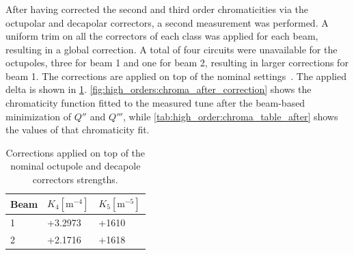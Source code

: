 \subsubsection{}

After having corrected the second and third order chromaticities via the octupolar and decapolar
correctors, a second measurement was performed.
A uniform trim on all the correctors of each class was applied for each beam, resulting in a global
correction. A total of four circuits were unavailable for the octupoles, three for beam 1 and one
for beam 2, resulting in larger corrections for beam 1. The corrections are applied on top of the
nominal settings~\cite{maclean_commissioning_2016}.
The applied delta is shown in \cref{tab:high_orders:mcdo_values_corr}.
\cref{fig:high_orders:chroma_after_correction} shows the chromaticity function fitted to the 
measured tune after the beam-based minimization of $Q''$ and $Q'''$, while
\cref{tab:high_order:chroma_table_after} shows the values of that chromaticity fit.

\begin{table}[!htb]
    \centering
    \begin{tabular}{lll}
    \toprule
      Beam  &    $K_4 [\mathrm{m}^{-4}]$      &  $K_5 [\mathrm{m}^{-5}]$  \\
    \midrule
        1   &  +3.2973     &  +1610   \\
        2   &   +2.1716    &  +1618   \\
    \bottomrule
    \end{tabular}
    \caption{Corrections applied on top of the nominal octupole and decapole correctors strengths.}
    \label{tab:high_orders:mcdo_values_corr}
  \end{table}

